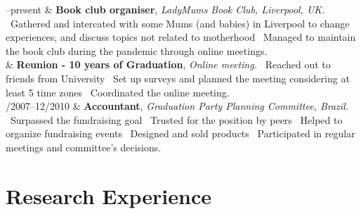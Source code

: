 \documentclass[11pt, a4paper]{article}
\newcommand{\Duration}[2]{\fontsize{10pt}{0}\selectfont #1--#2}
\newcommand{\Year}[1]{\fontsize{10pt}{0}\selectfont #1}
\begin{document}
\begin{EntriesTable}
	\Duration{2020}{present}  &
	\textbf{Book club organiser},
	\newline
	\textit{ LadyMums Book Club, Liverpool, UK.}
	\newline
	\textbullet \ Gathered and intercated with some Mums (and babies) in Liverpool to change
	experiences, and discuss topics not related to motherhood
	\textbullet \ Managed to maintain the book club during the pandemic through
	online meetings.
	\\
	\Year{2020}  &
	\textbf{Reunion - 10 years of Graduation},
	\newline
	\textit{ Online meeting.}
	\newline
	\textbullet \ Reached out to friends from University
	\textbullet \ Set up surveys and planned the meeting considering at least 5
	time zones
	\textbullet \ Coordinated the online meeting.
	\\
	\Duration{04/2007}{12/2010}  &
	\textbf{Accountant},
	\newline
	\textit{ Graduation Party Planning Committee, Brazil.}
	\newline
	\textbullet \ Surpassed the fundraising goal
	\textbullet \ Trusted for the position by peers
	\textbullet \ Helped to organize fundraising events
	\textbullet \ Designed and sold products
	\textbullet \ Participated in regular meetings and
	committee's decisions.

\end{EntriesTable}


\section*{Research Experience}
\end{document}
